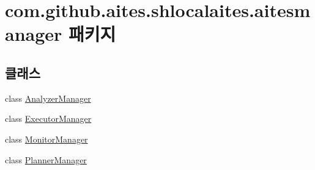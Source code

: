 \hypertarget{namespacecom_1_1github_1_1aites_1_1shlocalaites_1_1aitesmanager}{}\section{com.\+github.\+aites.\+shlocalaites.\+aitesmanager 패키지}
\label{namespacecom_1_1github_1_1aites_1_1shlocalaites_1_1aitesmanager}
\subsection*{클래스}
\begin{DoxyCompactItemize}
\item 
class \mbox{\hyperlink{classcom_1_1github_1_1aites_1_1shlocalaites_1_1aitesmanager_1_1_analyzer_manager}{Analyzer\+Manager}}
\item 
class \mbox{\hyperlink{classcom_1_1github_1_1aites_1_1shlocalaites_1_1aitesmanager_1_1_executor_manager}{Executor\+Manager}}
\item 
class \mbox{\hyperlink{classcom_1_1github_1_1aites_1_1shlocalaites_1_1aitesmanager_1_1_monitor_manager}{Monitor\+Manager}}
\item 
class \mbox{\hyperlink{classcom_1_1github_1_1aites_1_1shlocalaites_1_1aitesmanager_1_1_planner_manager}{Planner\+Manager}}
\end{DoxyCompactItemize}
